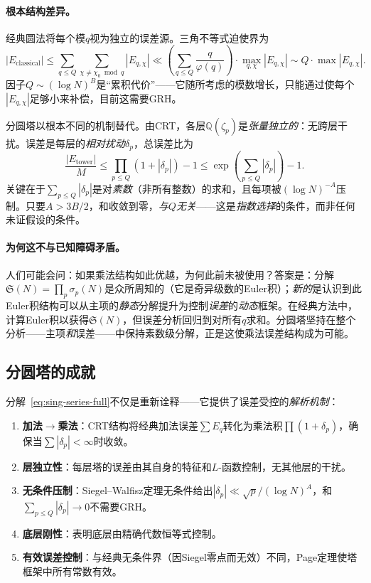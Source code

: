 \documentclass[11pt,a4paper]{article}
\theoremstyle{remark}
\newcommand{\Q}{\mathbb{Q}}
\begin{document}
\paragraph{根本结构差异。}
经典圆法将每个模$q$视为独立的误差源。三角不等式迫使界为
\begin{equation}
\label{eq:classical-accumulation}
  |E_{\text{classical}}| \leq \sum_{q \leq Q}\sum_{\chi \neq \chi_0 \bmod q}
    |E_{q,\chi}| \ll \left(\sum_{q \leq Q}\frac{q}{\varphi(q)}\right)
    \cdot \max_{q,\chi}|E_{q,\chi}| \sim Q \cdot \max|E_{q,\chi}|.
\end{equation}
因子$Q \sim (\log N)^B$是``累积代价''——它随所考虑的模数增长，只能通过使每个$|E_{q,\chi}|$足够小来补偿，目前这需要GRH。

分圆塔以根本不同的机制替代。由CRT，各层$\Q(\zeta_p)$是\emph{张量独立的}：无跨层干扰。误差是每层的\emph{相对扰动}$\delta_p$，总误差比为
\begin{equation}
\label{eq:tower-accumulation}
  \frac{|E_{\text{tower}}|}{M} \leq \prod_{p \leq Q}(1+|\delta_p|) - 1
    \leq \exp\!\left(\sum_{p \leq Q}|\delta_p|\right) - 1.
\end{equation}
关键在于$\sum_{p \leq Q}|\delta_p|$是对\emph{素数}（非所有整数）的求和，且每项被$(\log N)^{-A}$压制。只要$A > 3B/2$，和收敛到零，\emph{与$Q$无关}——这是\emph{指数选择}的条件，而非任何未证假设的条件。

\paragraph{为何这不与已知障碍矛盾。}
人们可能会问：如果乘法结构如此优越，为何此前未被使用？答案是：分解$\mathfrak{S}(N) = \prod_p \sigma_p(N)$是众所周知的（它是奇异级数的Euler积）；\emph{新的}是认识到此Euler积结构可以从主项的\emph{静态}分解提升为控制\emph{误差}的\emph{动态}框架。在经典方法中，计算Euler积以获得$\mathfrak{S}(N)$，但误差分析回归到对所有$q$求和。分圆塔坚持在整个分析——主项\emph{和}误差——中保持素数级分解，正是这使乘法误差结构成为可能。

\subsection{分圆塔的成就}

分解~\eqref{eq:sing-series-full}不仅是重新诠释——它提供了误差受控的\emph{解析机制}：

\begin{enumerate}[nosep]
  \item \textbf{加法$\to$乘法}：CRT结构将经典加法误差$\sum E_q$转化为乘法积$\prod(1+\delta_p)$，确保当$\sum|\delta_p| < \infty$时收敛。
  \item \textbf{层独立性}：每层塔的误差由其自身的特征和$L$-函数控制，无其他层的干扰。
  \item \textbf{无条件压制}：Siegel--Walfisz定理无条件给出$|\delta_p| \ll \sqrt{p}/(\log N)^A$，和$\sum_{p \leq Q}|\delta_p| \to 0$不需要GRH。
  \item \textbf{底层刚性}：表明底层由精确代数恒等式控制。
  \item \textbf{有效误差控制}：与经典无条件界（因Siegel零点而无效）不同，Page定理使塔框架中所有常数有效。
\end{enumerate}
\end{document}
